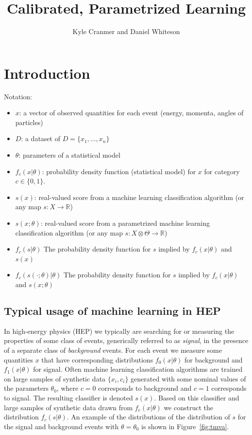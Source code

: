 \documentclass[11pt, oneside]{article}   	%
\title{Calibrated, Parametrized Learning}
\author{Kyle Cranmer and Daniel Whiteson}
\begin{document}
\maketitle

\section{Introduction}


Notation:

\begin{itemize}
 \item $x$: a vector of observed quantities for each event (energy, momenta, angles of particles)
 \item $D$: a dataset of $D=\{x_1, \dots, x_n\}$
 \item $\theta$: parameters of a statistical model
\item $f_c(x| \theta)$:  probability density function (statistical model) for $x$ for category $c\in\{0,1\}$.
\item $s(x)$: real-valued score from a machine learning classification algorithm (or any map $s: X\to\mathbb{R}$)
\item $s(x;\theta)$: real-valued score from a parametrized machine learning classification algorithm (or any map $s: X\otimes \Theta \to\mathbb{R}$)
\item $f_c( s | \theta )$ The probability density function for $s$ implied by $f_c(x|\theta)$ and $s(x)$
\item $f_c( s(\cdot; \theta) | \theta )$ The probability density function for $s$ implied by $f_c(x|\theta)$ and $s(x;\theta)$

\end{itemize}

\subsection{Typical usage of machine learning in HEP}

In high-energy physics (HEP) we typically are searching for or measuring the properties of some 
class of events, generically referred to as \textit{signal}, in the presence of a separate class 
of \textit{background} events. For each event we measure some quantities $x$ that have corresponding distributions 
$f_0(x|\theta)$ for background and $f_1(x|\theta)$ for signal.  Often machine learning classification algorithms are trained on large samples of synthetic data $\{x_i, c_i\}$ generated with some nominal values of the parameters $\theta_0$, where $c=0$ corresponds to background and $c=1$ corresponds to signal. The resulting classifier is denoted $s(x)$. Based on this classifier and large samples of synthetic data drawn from $f_c(x | \theta)$ we construct the distribution  $f_c(s | \theta)$. An example of the distributions of the distribution of $s$ for the signal and background events with $\theta=\theta_0$ is shown in Figure~\ref{fig:tmva}.
\end{document}
